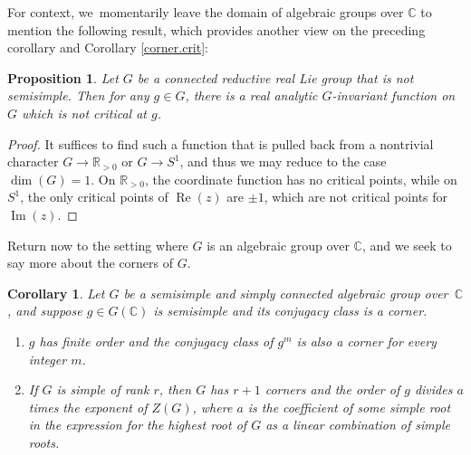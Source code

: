 \documentclass[JEP,XML,SOM,Unicode,NoFloatCountersInSection,published]{cedram}
\newtheorem{cor}[equation]{Corollary}
\newtheorem{prop}[equation]{Proposition}
\theoremstyle{definition}
\newcommand{\R}{\mathbb{R}}
\newcommand{\C}{\mathbb{C}}
\DeclareMathOperator{\RE}{Re}
\DeclareMathOperator{\IM}{Im}
\renewcommand{\Re}{\RE}
\begin{document}
For context, we~momentarily leave the domain of algebraic groups over $\C$ to mention the following result, which provides another view on the preceding corollary and Corollary \ref{corner.crit}:
\begin{prop}
Let $G$ be a connected reductive real Lie group that is not semisimple. Then for any $g\in G$, there is a real analytic $G$-invariant function on $G$ which is not critical at $g$.
\end{prop}

\begin{proof}
It suffices to find such a function that is pulled back from a nontrivial character $G\to \R_{>0}$ or $G\to S^1$, and thus we may reduce to the case $\dim(G)=1$. On $\R_{>0}$, the coordinate function has no critical points, while on $S^1$, the only critical points of $\Re(z)$ are $\pm 1$, which are not critical points for $\IM(z)$.
\end{proof}

Return now to the setting where $G$ is an algebraic group over $\C$, and we seek to say more about the corners of $G$.

\begin{cor} \label{corners.r}
Let $G$ be a semisimple and simply connected algebraic group over~$\C$, and suppose $g \in G(\C)$ is semisimple and its conjugacy class is a corner.
\begin{enumerate}
\item \label{corners.r.g} $g$ has finite order and the conjugacy class of $g^m$ is also a corner for every integer $m$.
\item \label{corners.r.simple} If $G$ is simple of rank $r$, then $G$ has $r+1$ corners and the order of $g$ divides $a$ times the exponent of $Z(G)$, where $a$ is the coefficient of some simple root in the expression for the highest root of $G$ as a linear combination of simple roots.
\end{enumerate}
\end{cor}
\end{document}
